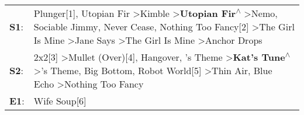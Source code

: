 \begin{supertabular}{p{0.03\textwidth}p{0.92\textwidth}}
 \textbf{S1}:  &  Plunger[1]\textsuperscript{}, \enspace Utopian Fir\textsuperscript{} \textgreater \enspace Kimble\textsuperscript{} \textgreater \enspace \textbf{Utopian Fir\textsuperscript{$\wedge$}} \textgreater \enspace Nemo\textsuperscript{}, \enspace Sociable Jimmy\textsuperscript{}, \enspace Never Cease\textsuperscript{}, \enspace Nothing Too Fancy[2]\textsuperscript{} \textgreater \enspace The Girl Is Mine\textsuperscript{} \textgreater \enspace Jane Says\textsuperscript{} \textgreater \enspace The Girl Is Mine\textsuperscript{} \textgreater \enspace Anchor Drops\textsuperscript{}  \enspace  \\
 \textbf{S2}:  &                                                                             2x2[3]\textsuperscript{} \textgreater \enspace Mullet (Over)[4]\textsuperscript{}, \enspace Hangover\textsuperscript{}, 's Theme\textsuperscript{} \textgreater \enspace \textbf{Kat's Tune\textsuperscript{$\wedge$}} \textgreater {}'s Theme\textsuperscript{}, \enspace Big Bottom\textsuperscript{}, \enspace Robot World[5]\textsuperscript{} \textgreater \enspace Thin Air\textsuperscript{}, \enspace Blue Echo\textsuperscript{} \textgreater \enspace Nothing Too Fancy\textsuperscript{}  \enspace  \\
 \textbf{E1}:  &                                                                                                                                                                                                                                                                                                                                                                                                                                                                                                                                                                      Wife Soup[6]\textsuperscript{}  \enspace  \\
\end{supertabular}
